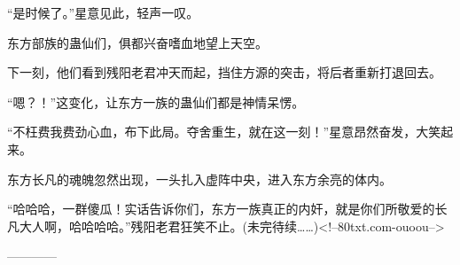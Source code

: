 \begin{this_body}
“是时候了。”星意见此，轻声一叹。

东方部族的蛊仙们，俱都兴奋嗜血地望上天空。

下一刻，他们看到残阳老君冲天而起，挡住方源的突击，将后者重新打退回去。

“嗯？！”这变化，让东方一族的蛊仙们都是神情呆愣。

“不枉费我费劲心血，布下此局。夺舍重生，就在这一刻！”星意昂然奋发，大笑起来。

东方长凡的魂魄忽然出现，一头扎入虚阵中央，进入东方余亮的体内。

“哈哈哈，一群傻瓜！实话告诉你们，东方一族真正的内奸，就是你们所敬爱的长凡大人啊，哈哈哈哈。”残阳老君狂笑不止。(未完待续……)<!--80txt.com-ouoou-->

------------

\end{this_body}

